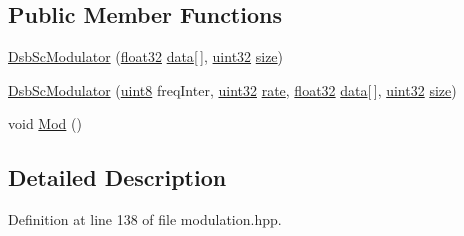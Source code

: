 \subsection*{Public Member Functions}
\begin{DoxyCompactItemize}
\item 
\hyperlink{classradio_1_1DsbScModulator_a42c1c1334d51a32a36dce54cd8cf1201}{Dsb\+Sc\+Modulator} (\hyperlink{definitions_8hpp_aacdc525d6f7bddb3ae95d5c311bd06a1}{float32} \hyperlink{classradio_1_1Modulator_a39d698f7720aa3677ecaf1baf83c8fa0}{data}\mbox{[}$\,$\mbox{]}, \hyperlink{definitions_8hpp_a1134b580f8da4de94ca6b1de4d37975e}{uint32} \hyperlink{classradio_1_1Modulator_ad1fbba4bdd6a8c8d2ff05cb7be60fc5c}{size})
\item 
\hyperlink{classradio_1_1DsbScModulator_a14281797132e055bc2e2a726ca5932a0}{Dsb\+Sc\+Modulator} (\hyperlink{definitions_8hpp_adde6aaee8457bee49c2a92621fe22b79}{uint8} freq\+Inter, \hyperlink{definitions_8hpp_a1134b580f8da4de94ca6b1de4d37975e}{uint32} \hyperlink{classradio_1_1Modulator_a8901a2170e850a767dd40f9494dd7536}{rate}, \hyperlink{definitions_8hpp_aacdc525d6f7bddb3ae95d5c311bd06a1}{float32} \hyperlink{classradio_1_1Modulator_a39d698f7720aa3677ecaf1baf83c8fa0}{data}\mbox{[}$\,$\mbox{]}, \hyperlink{definitions_8hpp_a1134b580f8da4de94ca6b1de4d37975e}{uint32} \hyperlink{classradio_1_1Modulator_ad1fbba4bdd6a8c8d2ff05cb7be60fc5c}{size})
\item 
void \hyperlink{classradio_1_1DsbScModulator_a0925dbd82745c282a488a45b0ee1410b}{Mod} ()
\end{DoxyCompactItemize}


\subsection{Detailed Description}


Definition at line 138 of file modulation.\+hpp.



